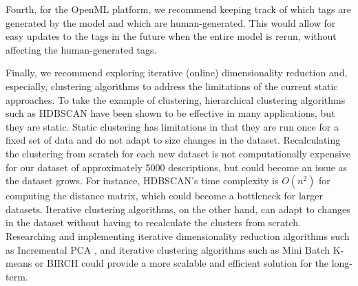 Fourth, for the OpenML platform, we recommend keeping track of which tags are generated by the model and which are human-generated. This would allow for easy updates to the tags in the future when the entire model is rerun, without affecting the human-generated tags.

Finally, we recommend exploring iterative (online) dimensionality reduction and, especially, clustering algorithms to address the limitations of the current static approaches. To take the example of clustering, hierarchical clustering algorithms such as HDBSCAN have been shown to be effective in many applications, but they are static. Static clustering has limitations in that they are run once for a fixed set of data and do not adapt to size changes in the dataset. Recalculating the clustering from scratch for each new dataset is not computationally expensive for our dataset of approximately 5000 descriptions, but could become an issue as the dataset grows. For instance, HDBSCAN's time complexity is $O(n^2)$ for computing the distance matrix, which could become a bottleneck for larger datasets. Iterative clustering algorithms, on the other hand, can adapt to changes in the dataset without having to recalculate the clusters from scratch. Researching and implementing iterative dimensionality reduction algorithms such as Incremental PCA \cite{balsubramani_fast_2013,artac_incremental_2002,dagher_incremental_2010}, and iterative clustering algorithms \cite{montiel_online_2022} such as Mini Batch K-means \cite{bejar_alonso_k-means_2013,hicks_mbkmeans_2021} or BIRCH \cite{zhang_birch_1996} could provide a more scalable and efficient solution for the long-term.
